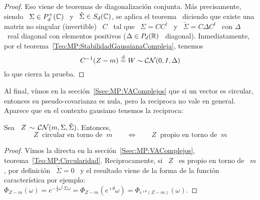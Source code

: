 \begin{proof}
  Eso  viene  de teoremas  de  diagonalizaci\'on  conjunta. M\'as  precisamente,
  siendo \ $\Sigma  \in P_d^+(\mathbb{C})$ \ y \  $\check{\Sigma} \in S_d(\mathbb{C})$, se
  aplica el  teorema~\cite[Teo.~7.6.5]{HorJoh13} diciendo que  existe una matriz
  no  singular (invertible)  \  $C$ \  tal  que \  $\Sigma  = C  C^\dag$  \ y  \
  $\check{\Sigma} = C  \Delta C^t$ \ con $\Delta$ \  real diagonal con elementos
  positivos  ($\Delta  \in  P_d(\mathbb{R})$  \  diagonal).  Inmediatamente,  por  el
  teorema~\ref{Teo:MP:StabilidadGaussianaCompleja}, tenemos
  \[
  C^{-1} (Z - m) \stackrel{\mathrm{d}}{=} W \sim \mathcal{C}\mathcal{N}(0,I,\Delta)
  \]
  lo que cierra la prueba.
\end{proof}


Al final, v\'imos en la  secci\'on~\ref{Ssec:MP:VAComplejos} que si un vector es
circular, entonces  su pseudo-covarianza es nula,  pero la reciproca  no vale en
general. Aparece que en el contexto gausiano tenemos la reciproca:
%

\begin{teorema}[Circularidad]\label{Teo:MP:CircularidadGaussiana}
%
Sea \ $Z \, \sim \, \mathcal{C}\mathcal{N}(m,\Sigma,\check{\Sigma})$.  Entonces,
  \[
  Z \: \mbox{ circular  en torno de } \: m \qquad  \Longleftrightarrow \qquad Z \:
\mbox{ propio en torno de } \: m
  \]
\end{teorema}
%
\begin{proof}
  V\'imos     la    directa    en     la    secci\'on~\ref{Ssec:MP:VAComplejos},
  teorema~\ref{Teo:MP:Circularidad}.  Reciprocamente,  si \  $Z$ \ es  propio en
  torno de \ $m$, por definici\'on \ $\check{\Sigma} = 0$ \ y el resultado viene
  de la forma de  la funci\'on caracter\'istica por ejemplo: $\Phi_{Z-m}(\omega)
  = e^{-\frac14 \omega^\dag \Sigma \omega } = \Phi_{Z-m}\left( e^{\imath \theta}
    \omega \right) = \Phi_{e^{\imath \theta} (Z-m)}(\omega)$.
\end{proof}


